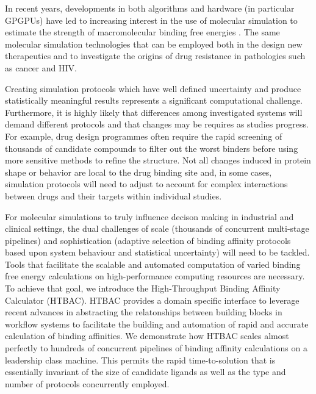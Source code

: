 In recent years, developments in both algorithms and hardware (in particular 
GPGPUs) have led to increasing interest in the use of molecular simulation to 
estimate the strength of macromolecular binding free energies \cite{DeVivo2016}. 
The same molecular simulation technologies that can be employed both in the
design new therapeutics and to investigate the origins of drug resistance in 
pathologies such as cancer and HIV. 

Creating simulation protocols which have well defined uncertainty and produce
statistically meaningful results represents a significant computational challenge. 
Furthermore, it is highly likely that differences among investigated systems will 
demand different protocols and that changes may be requires as studies progress. 
For example, drug design programmes often require the rapid screening of thousands 
of candidate compounds to filter out the worst binders before using more sensitive 
methods to refine the structure. 
Not all changes induced in protein shape or behavior are local to the drug binding 
site and, in some cases, simulation protocols will need to adjust to account for 
complex interactions between drugs and their targets within individual studies.

For molecular simulations to truly influence decison making in industrial and 
clinical settings, the dual challenges of
scale (thousands of concurrent multi-stage pipelines) and sophistication
(adaptive selection of binding affinity protocols based upon system behaviour and statistical uncertainty) will need to be tackled. 
Tools that facilitate the scalable and automated computation of varied binding 
free energy calculations on high-performance computing resources are necessary. 
To achieve that goal, we introduce the High-Throughput Binding Affinity Calculator 
(HTBAC).
HTBAC provides a domain specific interface to leverage recent advances in abstracting 
the relatonships between building blocks in workflow systems to facilitate the building 
and automation of rapid and accurate calculation of binding affinities.
We demonstrate how HTBAC scales almost perfectly to hundreds of concurrent
pipelines of binding affinity calculations on a leadership class machine. 
This permits the rapid time-to-solution that is essentially invariant of the size
of candidate ligands as well as the type and number of protocols concurrently
employed.

